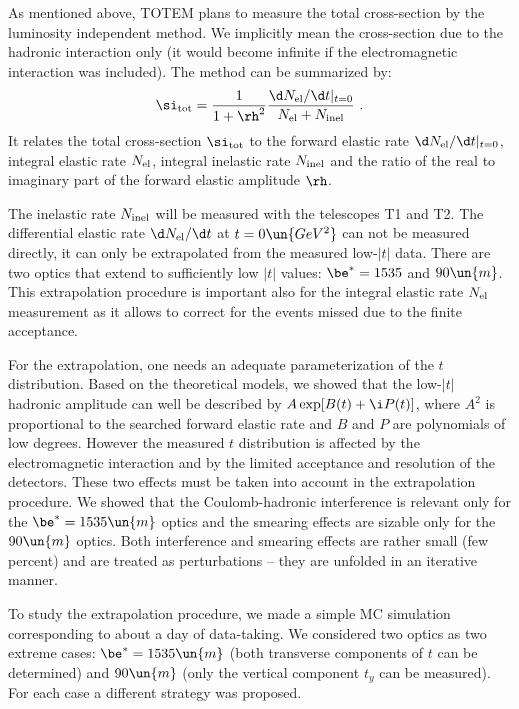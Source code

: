 \vskip1mm
As mentioned above, TOTEM plans to measure the total cross-section by the luminosity independent method. We implicitly mean the cross-section due to the hadronic interaction only (it would become infinite if the electromagnetic interaction was included). The method can be summarized by:
$$
	\si_{\rm tot} = {1\over 1+\rh^2} {\d N_{\rm el}/\d t|_{t=0}\over N_{\rm el} + N_{\rm inel}}\ .
$$
It relates the total cross-section $\si_{\rm tot}$ to the forward elastic rate $\d N_{\rm el}/\d t|_{t=0}$, integral elastic rate $N_{\rm el}$, integral inelastic rate $N_{\rm inel}$ and the ratio of the real to imaginary part of the forward elastic amplitude $\rh$.

The inelastic rate $N_{\rm inel}$ will be measured with the telescopes T1 and T2.
The differential elastic rate $\d N_{\rm el}/\d t$ at $t=0\un{GeV^2}$ can not be measured directly, it can only be extrapolated from the measured low-$|t|$ data. There are two optics that extend to sufficiently low $|t|$ values: $\be^* = 1535$ and $90\un{m}$. This extrapolation procedure is important also for the integral elastic rate $N_{\rm el}$ measurement as it allows to correct for the events missed due to the finite acceptance.

For the extrapolation, one needs an adequate parameterization of the $t$ distribution. Based on the theoretical models, we showed that the low-$|t|$ hadronic amplitude can well be described by $A \exp[B(t) + \i P(t)]$, where $A^2$ is proportional to the searched forward elastic rate and $B$ and $P$ are polynomials of low degrees. However the measured $t$ distribution is affected by the electromagnetic interaction and by the limited acceptance and resolution of the detectors. These two effects must be taken into account in the extrapolation procedure. We showed that the Coulomb-hadronic interference is relevant only for the $\be^*=1535\un{m}$ optics and the smearing effects are sizable only for the $90\un{m}$ optics. Both interference and smearing effects are rather small (few percent) and are treated as perturbations -- they are unfolded in an iterative manner.

To study the extrapolation procedure, we made a simple MC simulation corresponding to about a day of data-taking. We considered two optics as two extreme cases: $\be^* = 1535\un{m}$ (both transverse components of $t$ can be determined) and $90\un{m}$ (only the vertical component $t_y$ can be measured). For each case a different strategy was proposed.


